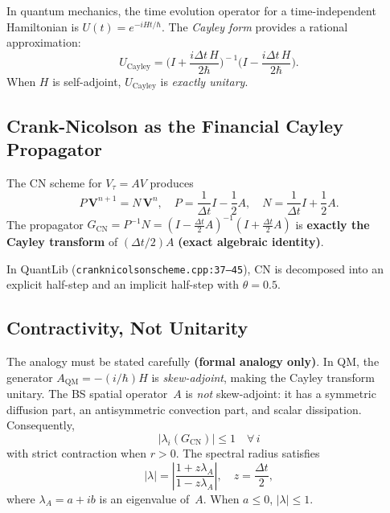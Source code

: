 In quantum mechanics, the time evolution operator for a time-independent Hamiltonian is $U(t) = e^{-iHt/\hbar}$.  The \emph{Cayley form} provides a rational approximation:
\begin{equation}\label{eq:cayley-qm}
  U_{\text{Cayley}}
  = \biggl(I + \frac{i\Delta t\,H}{2\hbar}\biggr)^{\!-1}
    \biggl(I - \frac{i\Delta t\,H}{2\hbar}\biggr).
\end{equation}
When $H$ is self-adjoint, $U_{\text{Cayley}}$ is \emph{exactly unitary}.

\subsection{Crank-Nicolson as the Financial Cayley Propagator}

The CN scheme for $V_\tau = AV$ produces
\begin{equation}\label{eq:cn-system}
  P\,\mathbf{V}^{n+1} = N\,\mathbf{V}^n,
  \quad P = \frac{1}{\Delta t}I - \frac{1}{2}A,
  \quad N = \frac{1}{\Delta t}I + \frac{1}{2}A.
\end{equation}
The propagator $G_{\text{CN}} = P^{-1}N = (I - \tfrac{\Delta t}{2}A)^{-1}(I + \tfrac{\Delta t}{2}A)$ is \textbf{exactly the Cayley transform} of $(\Delta t/2)A$ \textbf{(exact algebraic identity)}.

In QuantLib (\texttt{cranknicolsonscheme.cpp:37--45}), CN is decomposed into an explicit half-step and an implicit half-step with $\theta = 0.5$.

\subsection{Contractivity, Not Unitarity}

The analogy must be stated carefully \textbf{(formal analogy only)}.  In QM, the generator $A_{\text{QM}} = -(i/\hbar)H$ is \emph{skew-adjoint}, making the Cayley transform unitary.  The BS spatial operator~$A$ is \emph{not} skew-adjoint: it has a symmetric diffusion part, an antisymmetric convection part, and scalar dissipation.  Consequently,
\begin{equation*}
  |\lambda_i(G_{\text{CN}})| \le 1 \quad \forall\, i
\end{equation*}
with strict contraction when $r > 0$.  The spectral radius satisfies
\begin{equation}\label{eq:spectral-map}
  |\lambda| = \left|\frac{1 + z\lambda_A}{1 - z\lambda_A}\right|,
  \quad z = \frac{\Delta t}{2},
\end{equation}
where $\lambda_A = a + ib$ is an eigenvalue of~$A$.  When $a \le 0$, $|\lambda| \le 1$.

